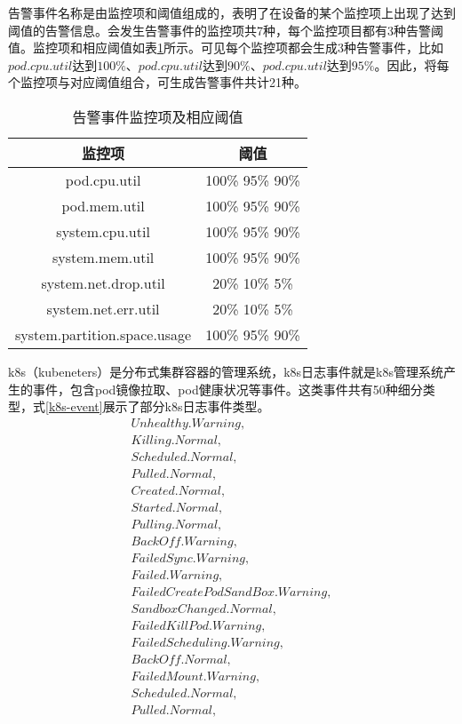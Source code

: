 告警事件名称是由监控项和阈值组成的，表明了在设备的某个监控项上出现了达到阈值的告警信息。会发生告警事件的监控项共7种，每个监控项目都有3种告警阈值。监控项和相应阈值如表\ref{alarm-event}所示。可见每个监控项都会生成3种告警事件，比如$pod.cpu.util$达到$100\%$、$pod.cpu.util$达到$90\%$、$pod.cpu.util$达到$95\%$。因此，将每个监控项与对应阈值组合，可生成告警事件共计21种。
\begin{table}[]
    \centering
    \caption{告警事件监控项及相应阈值}
    \label{alarm-event}
    \begin{tabular}{cc}
    \toprule
    监控项                          & 阈值              \\ \midrule
    pod.cpu.util                 & 100\% 95\% 90\% \\
    pod.mem.util                 & 100\% 95\% 90\% \\
    system.cpu.util              & 100\% 95\% 90\% \\
    system.mem.util              & 100\% 95\% 90\% \\
    system.net.drop.util         & 20\% 10\% 5\%   \\
    system.net.err.util          & 20\% 10\% 5\%   \\
    system.partition.space.usage & 100\% 95\% 90\% \\ 
    \bottomrule
    \end{tabular}
    \end{table}

k8s（kubeneters）是分布式集群容器的管理系统，k8s日志事件就是k8s管理系统产生的事件，包含pod镜像拉取、pod健康状况等事件。这类事件共有50种细分类型，式\ref{k8s-event}展示了部分k8s日志事件类型。
\begin{equation}
    \begin{array}{l}
        Unhealthy.Warning, \\
        Killing.Normal,\\
        Scheduled.Normal,\\
        Pulled.Normal,\\
        Created.Normal,\\
        Started.Normal,\\
        Pulling.Normal,\\
        BackOff.Warning,\\
        FailedSync.Warning,\\
        Failed.Warning,\\
        FailedCreatePodSandBox.Warning,\\
        SandboxChanged.Normal,\\
        FailedKillPod.Warning,\\
        FailedScheduling.Warning,\\
        BackOff.Normal,\\
        FailedMount.Warning,\\ 
        Scheduled.Normal,\\
        Pulled.Normal,\\
    \end{array}
    \label{k8s-event}
\end{equation}

